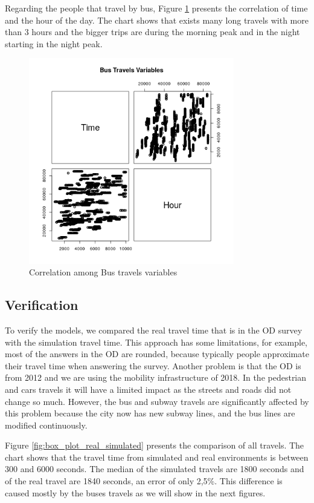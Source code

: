 Regarding the people that travel by bus, Figure \ref{fig:scatter_bus} presents the correlation of time and the hour of the day. The chart shows that exists many long travels with more than 3 hours and the bigger trips are during the morning peak and in the night starting in the night peak.

\begin{figure}[!htb]
\centering
\includegraphics[width=0.8\textwidth]{figuras/chap-sp/scatter_bus.png}
\caption{Correlation among Bus travels variables}
\label{fig:scatter_bus}
\end{figure}

\subsection{Verification}

To verify the models, we compared the real travel time that is in the OD survey with the simulation travel time. This approach has some limitations, for example, most of the answers in the OD are rounded, because typically people approximate their travel time when answering the survey. Another problem is that the OD is from 2012 and we are using the mobility infrastructure of 2018. In the pedestrian and cars travels it will have a limited impact as the streets and roads did not change so much. However, the bus and subway travels are significantly affected by this problem because the city now has new subway lines, and the bus lines are modified continuously.

Figure \ref{fig:box_plot_real_simulated} presents the comparison of all travels. The chart shows that the travel time from simulated and real environments is between 300 and 6000 seconds. The median of the simulated travels are 1800 seconds and of the real travel are 1840 seconds, an error of only 2,5\%. This difference is caused mostly by the buses travels as we will show in the next figures.

